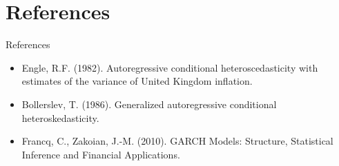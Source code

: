 \documentclass[9pt, aspectratio=169, t]{beamer}
\theoremstyle{definition}
\begin{document}
\section{References}

\begin{frame}{References}
    \begin{itemize}
        \item Engle, R.F. (1982). Autoregressive conditional heteroscedasticity with estimates of the variance of United Kingdom inflation.
        \item Bollerslev, T. (1986). Generalized autoregressive conditional heteroskedasticity.
        \item Francq, C., Zakoian, J.-M. (2010). GARCH Models: Structure, Statistical Inference and Financial Applications.
    \end{itemize}
\end{frame}
\end{document}
